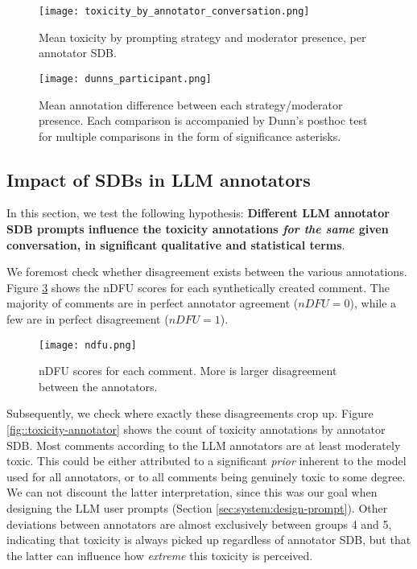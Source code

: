 \begin{figure}
	\centering
	\texttt{[image: toxicity\_by\_annotator\_conversation.png]}
	\caption{Mean toxicity by prompting strategy and moderator presence, per annotator \ac{SDB}.}
	\label{fig::toxicity-strategy}
\end{figure}

\begin{figure}
	\centering
	\texttt{[image: dunns\_participant.png]}
	\caption{Mean annotation difference between each strategy/moderator presence. Each comparison is accompanied by Dunn's posthoc test for multiple comparisons in the form of significance asterisks.}
	\label{fig::toxicity-strategy-significance}
\end{figure}



\subsection{Impact of SDBs in LLM annotators}
\label{ssec:evaluation:annotators}

In this section, we test the following hypothesis: \textbf{Different LLM annotator \ac{SDB} prompts influence the toxicity annotations \textit{for the same} given conversation, in significant qualitative and statistical terms}. 

We foremost check whether disagreement exists between the various annotations. Figure \ref{fig::toxicity-ndfu} shows the  \ac{nDFU}\cite{pavlopoulos-likas-2024-polarized} scores for each synthetically created comment. The majority of comments are in perfect annotator agreement ($nDFU=0$), while a few are in perfect disagreement ($nDFU=1$).

\begin{figure}
	\centering
	\texttt{[image: ndfu.png]}
	\caption{\ac{nDFU} \cite{pavlopoulos-likas-2024-polarized} scores for each comment. More is larger disagreement between the annotators.}
	\label{fig::toxicity-ndfu}
\end{figure}

Subsequently, we check where exactly these disagreements crop up. Figure \ref{fig::toxicity-annotator} shows the count of toxicity annotations by annotator \ac{SDB}. Most comments according to the LLM annotators are at least moderately toxic. This could be either attributed to a significant \textit{prior} inherent to the model used for all annotators, or to all comments being genuinely toxic to some degree. We can not discount the latter interpretation, since this was our goal when designing the LLM user prompts (Section \ref{sec:system:design-prompt}). Other deviations between annotators are almost exclusively between groups 4 and 5, indicating that toxicity is always picked up regardless of annotator \ac{SDB}, but that the latter can influence how \textit{extreme} this toxicity is perceived.

